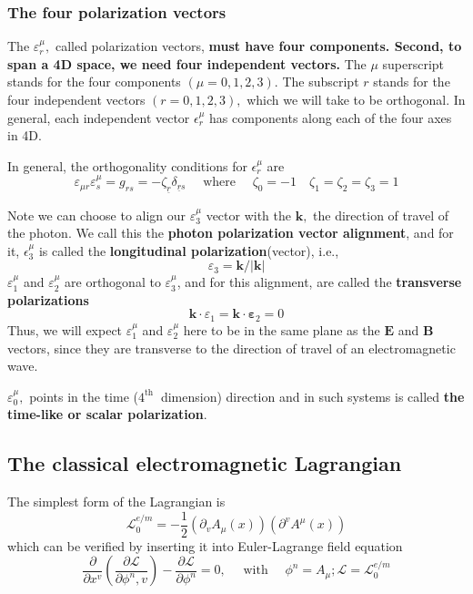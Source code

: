 \subsubsection{The four polarization vectors}
The $\varepsilon_{r}^{\mu},$ called polarization vectors, \textbf{must have four components. Second, to span a 4D space, we need four independent vectors.} The $\mu$ superscript stands for the four components $(\mu=0,1,2,3) .$ The subscript $r$ stands for the four independent vectors $(r=0,1,2,3),$ which we will take to be orthogonal. In general, each independent vector $\epsilon_r^{\mu}$ has components along each of the four axes in 4D.
\begin{qt}
In general, the orthogonality conditions for $\epsilon_r^{\mu}$ are
\begin{equation}
\varepsilon_{\mu r} \varepsilon_{s}^{\mu}=g_{r s}=-\zeta_{\underline{r}} \delta_{\underline{r}s} \quad \text { where } \quad \zeta_{0}=-1 \quad \zeta_{1}=\zeta_{2}=\zeta_{3}=1
\end{equation}
\end{qt}
Note we can choose to align our $\varepsilon_{3}^{\mu}$ vector with the $\mathbf{k},$ the direction of travel of the photon. We call this the \textbf{photon polarization vector alignment}, and for it, $\epsilon_3^{\mu}$ is called the \textbf{longitudinal polarization}(vector), i.e.,
$$
\varepsilon_{3}=\mathbf{k} /|\mathbf{k}|
$$
$\varepsilon_{1}^{\mu}$ and $\varepsilon_{2}^{\mu}$ are orthogonal to $\varepsilon_{3}^{\mu}$, and for this alignment, are called the \textbf{transverse polarizations}
$$
\mathbf{k} \cdot \varepsilon_{1}=\mathbf{k} \cdot \mathbf{\varepsilon}_{2}=0
$$
Thus, we will expect $\varepsilon_{1}^{\mu}$ and $\varepsilon_{2}^{\mu}$ here to be in the same plane as the $\mathbf{E}$ and $\mathbf{B}$ vectors, since they are transverse to the direction of travel of an electromagnetic wave.

$\varepsilon_{0}^{\mu},$ points in the time ($4^{\text {th }}$ dimension) direction and in such systems is called \textbf{the time-like or scalar polarization}.

\subsection{The classical electromagnetic Lagrangian}
The simplest form of the Lagrangian is
\begin{equation}
\mathcal{L}_{0}^{e / m}=-\frac{1}{2}\left(\partial_{v} A_{\mu}(x)\right)\left(\partial^{v} A^{\mu}(x)\right)
\label{classical-electromagnetic-Lagrangia}
\end{equation}
which can be verified by inserting it into Euler-Lagrange field equation
\begin{equation}
\frac{\partial}{\partial x^{v}}\left(\frac{\partial \mathcal{L}}{\partial \phi^{n}, v}\right)-\frac{\partial \mathcal{L}}{\partial \phi^{n}}=0, \quad \text { with } \quad \phi^{n}=A_{\mu} ; \mathcal{L}=\mathcal{L}_{0}^{e / m}
\end{equation}
